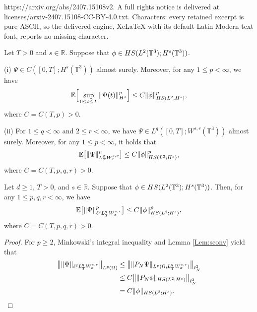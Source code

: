 \documentclass[10pt,a4paper]{amsart}
\newcommand{\HS}{\textup{HS}}
\newcommand{\R}{\mathbb{R}}
\newcommand{\T}{\mathbb{T}}
\newcommand{\noi}{\noindent}
\renewcommand{\O}{\Omega}
\renewcommand{\l}{\ell}
\begin{document}
https://arxiv.org/abs/2407.15108v2. A full rights notice is delivered at licenses/arxiv-2407.15108-CC-BY-4.0.txt. Characters: every retained excerpt is pure ASCII, so the delivered engine, XeLaTeX with its default Latin Modern text font, reports no missing character.
\begin{lemma}\label{Lem:sconv}
Let $T>0$ and $s \in \R$.
Suppose that 
$\phi\in \HS(L^2(\mathbb{T}^3); H^s(\T^3))$.


\noi
\textup{(i)} 
$\Psi\in C([0,T];H^s(\T^3))$ almost surely. 
Moreover, for any $1\leq p<\infty$, we have
\[
    \mathbb{E}
    \Big[\sup_{0\leq t\leq T}\|\Psi (t) \|^p_{H^s}\Big]
    \leq
    C\|\phi\|_{\HS(L^2;H^s)}^p,
\]
where $C=C(T,p)>0$.



\noi
\textup{(ii)}
For $1\leq q<\infty$ and $2\leq r<\infty$,
we have
$\Psi\in L^q([0,T];W^{s,r}(\T^3))$ almost surely.
Moreover,
for any $1\leq p<\infty$, it holds that
\begin{align}\label{eq:reg s-t}
    \mathbb{E}
    \big[
    \|\Psi\|_{L^q_T W_x^{s,r}}^p
    \big]
    \leq
    C\|\phi\|^p_{\HS(L^2;H^s)},
\end{align}
where $C=C(T,p,q,r)>0$.

\end{lemma}

\begin{lemma}\label{Lem:sconv1}
Let $d\geq 1$, $T>0$, and $s \in \R$.
Suppose that $\phi\in \HS(L^2(\mathbb{T}^3); H^s(\T^3))$.
Then,
for any $1\leq p,q,r<\infty$, we have
\[
    \mathbb{E}
    \big[
   \| \Psi\|_{\l^2 L^q_T W_x^{s,r}}^p
    \big]
\leq
    C\|\phi\|^p_{\HS(L^2;H^s)},
\]
where $C=C(T,p,q,r)>0$.
\end{lemma}

\begin{proof}
For $p \ge 2$,
Minkowski's integral inequality
and
Lemma \ref{Lem:sconv}
yield that
\begin{align*}
\big\| \| \Psi\|_{\l^2 L^q_T W_x^{s,r}} \big\|_{L^p(\O)}
&\le
\big\| \| P_N \Psi \|_{L^p(\O; L^q_T W_x^{s,r})} \big\|_{\l^2_N}
\\
&\le
C
\big\| \| P_N \phi \|_{\HS(L^2; H^s)} \big\|_{\l^2_N}
\\
&=
C
\|\phi\|_{\HS(L^2;H^s)}.
\end{align*}
\end{proof}
\end{document}
